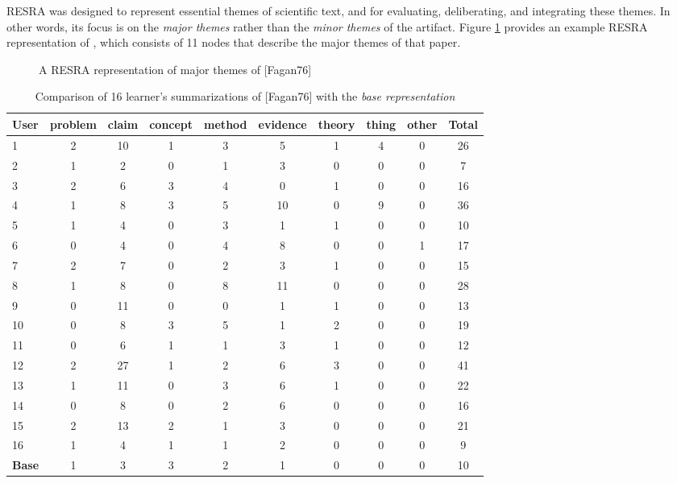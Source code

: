 RESRA was designed to represent essential themes of scientific text, and
for evaluating, deliberating, and integrating these themes.  In other
words, its focus is on the {\it major themes\/} rather than the {\it minor
themes\/} of the artifact. Figure \ref{fig:fagan} provides an example RESRA
representation of \cite{Fagan76}, which consists of 11 nodes that describe
the major themes of that paper.

\begin{figure}[hbtp]
 \caption{A RESRA representation of major themes of [Fagan76]}
  \label{fig:fagan}
\end{figure}

\small
\begin{table}[hbtp]
  \caption{Comparison of 16 learner's summarizations of [Fagan76] with the
  {\it base representation\/}}
  \begin{center}
  \begin{tabular} {||l|c|c|c|c|c|c|c|c|c||} \hline
  {\bf User} & {\sf problem} & {\sf claim} & {\sf concept} & {\sf method} &
  {\sf evidence} & {\sf theory} & {\sf thing} & {\sf other} & {\bf Total}
  \\ \hline \hline

1 & 2 &    10 &   1 &   3 &   5 &   1  &  4 &   0 &   26 \\ \hline
2 & 1 &    2 &    0 &   1 &   3 &   0  &  0 &   0 &   7  \\ \hline
3 & 2 &    6 &    3 &   4 &   0 &   1  &  0 &   0 &   16  \\ \hline
4 & 1 &    8 &    3 &   5 &   10 &  0  &  9 &   0 &   36  \\ \hline
5 & 1 &    4 &    0 &   3 &   1 &   1  &  0 &   0 &   10  \\ \hline
6 & 0 &    4 &    0 &   4 &   8 &   0  &  0 &   1 &   17 \\ \hline
7 & 2 &    7 &    0 &   2 &   3 &   1  &  0 &   0 &   15 \\ \hline
8 & 1 &    8 &    0 &   8 &   11 &  0  &  0 &   0 &   28 \\ \hline
9 & 0 &    11 &   0 &   0 &   1 &   1  &  0 &   0 &   13 \\ \hline
10 & 0 &   8 &    3 &   5 &   1 &   2  &  0 &   0 &   19 \\ \hline
11 & 0 &   6 &    1 &   1 &   3 &   1  &  0 &   0 &   12 \\ \hline
12 & 2 &   27 &   1 &   2 &   6 &   3  &  0 &   0 &   41 \\ \hline
13 & 1 &   11 &   0 &   3 &   6 &   1  &  0 &   0 &   22 \\ \hline
14 & 0 &   8 &    0 &   2 &   6 &   0  &  0 &   0 &   16 \\ \hline
15 & 2 &   13 &   2 &   1 &   3 &   0  &  0 &   0 &   21 \\  \hline
16 & 1 &   4 &    1 &   1 &   2 &   0  &  0 &   0 &   9  \\ \hline
{\bf Base} & 1 & 3 &   3 &   2 &   1  &  0 &   0 &  0 & 10 \\
 \hline \hline
\end{tabular}
\end{center}
\label{tab:fagan}
\end{table}
\normalsize
{}

